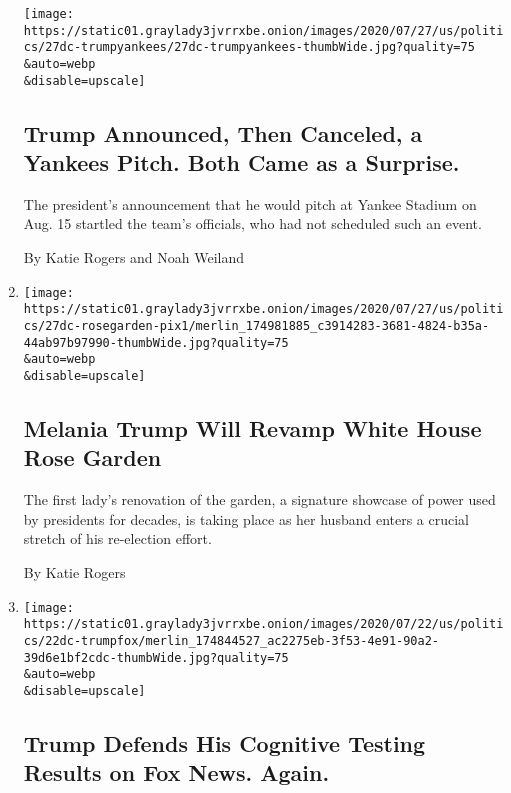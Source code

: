 \begin{enumerate}
  \texttt{[image: https://static01.graylady3jvrrxbe.onion/images/2020/07/27/us/politics/27dc-trumpyankees/27dc-trumpyankees-thumbWide.jpg?quality=75\\\&auto=webp\\\&disable=upscale]}

  \hypertarget{trump-announced-then-canceled-a-yankees-pitch-both-came-as-a-surprise}{%
  \subsection{Trump Announced, Then Canceled, a Yankees Pitch. Both Came
  as a
  Surprise.}\label{trump-announced-then-canceled-a-yankees-pitch-both-came-as-a-surprise}}

  The president's announcement that he would pitch at Yankee Stadium on
  Aug. 15 startled the team's officials, who had not scheduled such an
  event.

  By Katie Rogers and Noah Weiland
\item
  \href{/2020/07/27/us/politics/melania-trump-white-house-rose-garden.html}{}

  \texttt{[image: https://static01.graylady3jvrrxbe.onion/images/2020/07/27/us/politics/27dc-rosegarden-pix1/merlin\_174981885\_c3914283-3681-4824-b35a-44ab97b97990-thumbWide.jpg?quality=75\\\&auto=webp\\\&disable=upscale]}

  \hypertarget{melania-trump-will-revamp-white-house-rose-garden}{%
  \subsection{Melania Trump Will Revamp White House Rose
  Garden}\label{melania-trump-will-revamp-white-house-rose-garden}}

  The first lady's renovation of the garden, a signature showcase of
  power used by presidents for decades, is taking place as her husband
  enters a crucial stretch of his re-election effort.

  By Katie Rogers
\item
  \href{/2020/07/22/us/politics/trump-cognitive-test-results.html}{}

  \texttt{[image: https://static01.graylady3jvrrxbe.onion/images/2020/07/22/us/politics/22dc-trumpfox/merlin\_174844527\_ac2275eb-3f53-4e91-90a2-39d6e1bf2cdc-thumbWide.jpg?quality=75\\\&auto=webp\\\&disable=upscale]}

  \hypertarget{trump-defends-his-cognitive-testing-results-on-fox-news-again}{%
  \subsection{Trump Defends His Cognitive Testing Results on Fox News.
  Again.}\label{trump-defends-his-cognitive-testing-results-on-fox-news-again}}


\end{enumerate}
